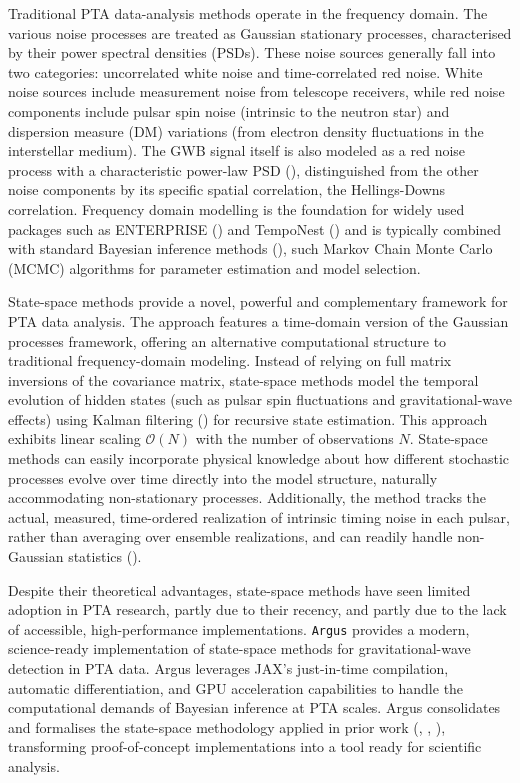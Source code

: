 \documentclass[
]{article}
\begin{document}
Traditional PTA data-analysis methods operate in the frequency domain.
The various noise processes are treated as Gaussian stationary
processes, characterised by their power spectral densities (PSDs). These
noise sources generally fall into two categories: uncorrelated white
noise and time-correlated red noise. White noise sources include
measurement noise from telescope receivers, while red noise components
include pulsar spin noise (intrinsic to the neutron star) and dispersion
measure (DM) variations (from electron density fluctuations in the
interstellar medium). The GWB signal itself is also modeled as a red
noise process with a characteristic power-law PSD
(), distinguished
from the other noise components by its specific spatial correlation, the
Hellings-Downs correlation. Frequency domain modelling is the foundation
for widely used packages such as ENTERPRISE
() and TempoNest
() and is typically
combined with standard Bayesian inference methods
(), such
Markov Chain Monte Carlo (MCMC) algorithms for parameter estimation and
model selection.

State-space methods provide a novel, powerful and complementary
framework for PTA data analysis. The approach features a time-domain
version of the Gaussian processes framework, offering an alternative
computational structure to traditional frequency-domain modeling.
Instead of relying on full matrix inversions of the covariance matrix,
state-space methods model the temporal evolution of hidden states (such
as pulsar spin fluctuations and gravitational-wave effects) using Kalman
filtering () for recursive
state estimation. This approach exhibits linear scaling
\(\mathcal{O}(N)\) with the number of observations \(N\). State-space
methods can easily incorporate physical knowledge about how different
stochastic processes evolve over time directly into the model structure,
naturally accommodating non-stationary processes. Additionally, the
method tracks the actual, measured, time-ordered realization of
intrinsic timing noise in each pulsar, rather than averaging over
ensemble realizations, and can readily handle non-Gaussian statistics
().

Despite their theoretical advantages, state-space methods have seen
limited adoption in PTA research, partly due to their recency, and
partly due to the lack of accessible, high-performance implementations.
\texttt{Argus} provides a modern, science-ready implementation of
state-space methods for gravitational-wave detection in PTA data. Argus
leverages JAX's just-in-time compilation, automatic differentiation, and
GPU acceleration capabilities to handle the computational demands of
Bayesian inference at PTA scales. Argus consolidates and formalises the
state-space methodology applied in prior work
(,
, ),
transforming proof-of-concept implementations into a tool ready for
scientific analysis.
\end{document}
